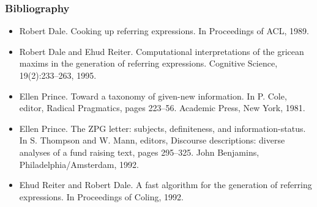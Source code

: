\documentclass[compress,color=usenames]{beamer}
\begin{document}
\begin{frame}
\frametitle{Bibliography} 

\begin{itemize}\small

\item Robert Dale.
Cooking up referring expressions.
In Proceedings of ACL, 1989.

\item Robert Dale and Ehud Reiter.
Computational interpretations of the gricean maxims in the generation of referring expressions.
Cognitive Science, 19(2):233--263, 1995.

\item Ellen Prince.
Toward a taxonomy of given-new information.
In P. Cole, editor, Radical Pragmatics, pages 223--56. Academic Press, New York, 1981.

\item Ellen Prince.
The ZPG letter: subjects, deﬁniteness, and information-status.
In S. Thompson and W. Mann, editors, Discourse descriptions: diverse analyses of a fund raising text, pages
295--325. John Benjamins, Philadelphia/Amsterdam, 1992.

\item Ehud Reiter and Robert Dale.
A fast algorithm for the generation of referring expressions.
In Proceedings of Coling, 1992.
\end{itemize}

\end{frame}
\end{document}
